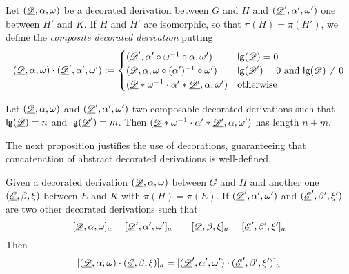 \begin{definition}\label{def:conc}
	Let $(\underline{\mathscr{D}}, \alpha, \omega)$ be a decorated derivation between $G$ and $H$ and $(\underline{\mathscr{D}}', \alpha', \omega')$ one between $H'$ and $K$. If $H$ and $H'$ are isomorphic, so that $\pi(H)=\pi(H')$, we define the  \emph{composite decorated derivation} putting
	\[(\underline{\mathscr{D}}, \alpha, \omega)\cdot (\underline{\mathscr{D}}', \alpha', \omega'):=\begin{cases}
		(\underline{\mathscr{D}}', \alpha'\circ \omega^{-1}\circ \alpha, \omega')	&\mathsf{lg}(\underline{\mathscr{D}})=0 \\
		(\underline{\mathscr{D}}, \alpha, \omega \circ (\alpha')^{-1}\circ \omega')&\mathsf{lg}(\underline{\mathscr{D}}')=0 \text{ and } \mathsf{lg}(\underline{\mathscr{D}})\neq 0\\
		(\underline{\mathscr{D}}*\omega^{-1}\cdot \alpha'*\underline{\mathscr{D'}}, \alpha, \omega')	&\text{otherwise}
	\end{cases}\]
\end{definition}


\begin{remark}\label{rem:lgt}
	Let $(\underline{\mathscr{D}}, \alpha, \omega)$ and $(\underline{\mathscr{D}}', \alpha', \omega')$ two composable decorated derivations   such that $\mathsf{lg}(\underline{\mathscr{D}})=n$ and $\mathsf{lg}(\underline{\mathscr{D}}')=m$.	 Then $(\underline{\mathscr{D}}*\omega^{-1}\cdot \alpha'*\underline{\mathscr{D'}}, \alpha, \omega')$ has length $n+m$.
\end{remark}

The next proposition justifies the use of decorations, guaranteeing that concatenation of abstract decorated derivations is well-defined.
\begin{lemma}\label{lem:conc}
	Given a decorated derivation $(\underline{\mathscr{D}}, \alpha, \omega)$  between $G$ and $H$ and  another one $(\underline{\mathscr{E}}, \beta, \xi)$ between $E$ and $K$ with $\pi(H)=\pi(E)$. If  $(\underline{\mathscr{D}}', \alpha', \omega')$ and $(\underline{\mathscr{E}}', \beta', \xi')$ are two other decorated derivations such that
	\[[\underline{\mathscr{D}}, \alpha, \omega]_a = [\underline{\mathscr{D}}', \alpha', \omega']_a \qquad [\underline{\mathscr{D}}, \beta, \xi]_a=[\underline{\mathscr{E}}', \beta', \xi']_a\]
	Then
	\[[(\underline{\mathscr{D}}, \alpha, \omega)\cdot (\underline{\mathscr{E}}, \beta, \xi)]_a=[(\underline{\mathscr{D}}', \alpha', \omega')\cdot (\underline{\mathscr{E}}', \beta', \xi')]_a\]
\end{lemma}

